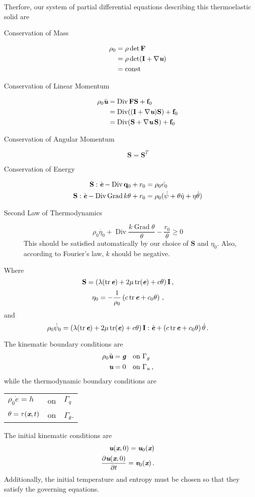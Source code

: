 \documentclass[letterpaper,10pt]{article}
\DeclareMathOperator*{\tGrad}{Grad}
\DeclareMathOperator*{\tDiv}{Div}
\DeclareMathOperator*{\tr}{tr}
\def\mathbi#1{\textbf{\em #1}}
\begin{document}
Therfore, our system of partial differential equations describing this
thermoelastic solid are
\begin{description}
\item[Conservation of Mass]
\begin{align*}
\rho_0&=\rho\det\mathbf{F}\\
&=\rho\det(\mathbf{I}+\nabla\mathbi{u})\\
&=\mathrm{const}
\end{align*}
\item[Conservation of Linear Momentum]
\begin{align*}
\rho_0\ddot{\mathbi{u}}&=\tDiv{\mathbf{FS}}+\mathbf{f}_0\\
&=\tDiv((\mathbf{I}+\nabla\mathbi{u})\mathbf{S})+\mathbf{f}_0\\
&=\tDiv(\mathbf{S}+\nabla\mathbi{u}\,\mathbf{S})+\mathbf{f}_0
\end{align*}
\item[Conservation of Angular Momentum]
\[
\mathbf{S}=\mathbf{S}^T
\]
\item[Conservation of Energy]
\begin{align*}
\mathbf{S}:\dot{\mathbi{e}}-\tDiv{\mathbf{q}_0}+r_0&=\rho_0\dot{e_0}\\
\mathbf{S}:\dot{\mathbi{e}}-\tDiv{\tGrad{k\theta}}+r_0
&=\rho_0(\dot\psi+\theta\dot\eta+\eta\dot\theta)
\end{align*}
\item[Second Law of Thermodynamics]
\[
\rho_0\dot{\eta_0}+\tDiv{\frac{k\tGrad{\theta}}{\theta}}-\frac{r_0}{\theta}\geq0
\]
This should be satisfied automatically by our choice of $\mathbf{S}$ and
$\eta_0$. Also, according to Fourier's law, $k$ should be negative.
\end{description}
Where
\[
\mathbf{S}=\left(\lambda(\tr\mathbi{e})
+2\mu\tr(\mathbi{e})
+c\theta\right)\mathbf{I}\,,
\]
\[
\eta_0=-\frac{1}{\rho_0}\left(c\tr\mathbi{e}+c_0\theta\right)\,,
\]
and
\[
\rho_0\dot\psi_0=\left(\lambda(\tr\mathbi{e})
+2\mu\tr(\mathbi{e})
+c\theta\right)\mathbf{I}:\dot{\mathbi{e}}
+\left(c\tr\mathbi{e}+c_0\theta\right)\dot\theta\,.
\]

The kinematic boundary conditions are
\begin{align*}
\rho_0\ddot{\mathbi{u}}=\mathbi{g}\quad&\text{on }\Gamma_g\\
\mathbi{u}=0\quad&\text{on }\Gamma_u\,,
\end{align*}
while the thermodynamic boundary conditions are
\begin{center}
\begin{tabular}{lll}
$\rho_0\dot{e}=h$ & on & $\Gamma_q$ \\ 
$\theta=\tau(\mathbi{x},t)$ & on & $\Gamma_\theta$.
\end{tabular}
\end{center}
The initial kinematic conditions are
\begin{align*}
\mathbi{u}(\mathbi{x},0)=\mathbi{u}_0(\mathbi{x})\\
\frac{\partial\mathbi{u}(\mathbi{x},0)}{\partial t}=\mathbi{v}_0(\mathbi{x})\,.
\end{align*}
Additionally, the initial temperature and entropy must be chosen so
that they satisfy the governing equations. 
\end{document}
